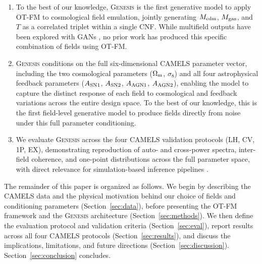 \documentclass[usenatbib]{mnras}
\newcommand{\Mcdm}{M_{\rm cdm}}
\newcommand{\Mgas}{M_{\rm gas}}
\newcommand{\Tgas}{T}
\newcommand{\Om}{\Omega_{\rm m}}
\newcommand{\sig}{\sigma_8}
\begin{document}
\begin{enumerate}[label=\arabic*., leftmargin=*, labelsep=0.5em]
  \item To the best of our knowledge, \textsc{Genesis} is the first
        generative model to apply OT-FM to cosmological field emulation,
        jointly generating $\Mcdm$, $\Mgas$, and $\Tgas$ as a
        correlated triplet within a single CNF. While multifield
        outputs have been explored with GANs
        \citep{Andrianomena2022,Andrianomena2024}, no prior work
        has produced this specific combination of fields using
        OT-FM.

  \item \textsc{Genesis} conditions on the full six-dimensional
        CAMELS parameter vector, including the two cosmological
        parameters ($\Om$, $\sig$) and all four astrophysical
        feedback parameters
        ($A_{\rm SN1}$, $A_{\rm SN2}$, $A_{\rm AGN1}$, $A_{\rm AGN2}$),
        enabling the model to capture the distinct response of each
        field to cosmological and feedback variations across the
        entire design space. To the best of our knowledge, this is
        the first field-level generative model to produce fields
        directly from noise under this full parameter conditioning.

  \item We evaluate \textsc{Genesis} across the four CAMELS validation
        protocols (LH, CV, 1P, EX), demonstrating reproduction of
        auto- and cross-power spectra, inter-field coherence, and
        one-point distributions across the full parameter space,
        with direct
        relevance for simulation-based inference pipelines
        \citep{Cranmer2020,Mudur2024DiffHMC}.
\end{enumerate}

The remainder of this paper is organized as follows.
We begin by describing the CAMELS data and the physical motivation
behind our choice of fields and conditioning parameters
(Section~\ref{sec:data}), before presenting the OT-FM framework
and the \textsc{Genesis} architecture (Section~\ref{sec:methods}).
We then define the evaluation protocol and validation criteria
(Section~\ref{sec:eval}), report results across all four CAMELS
protocols (Section~\ref{sec:results}), and discuss the implications,
limitations, and future directions (Section~\ref{sec:discussion}).
Section~\ref{sec:conclusion} concludes.

\end{document}
